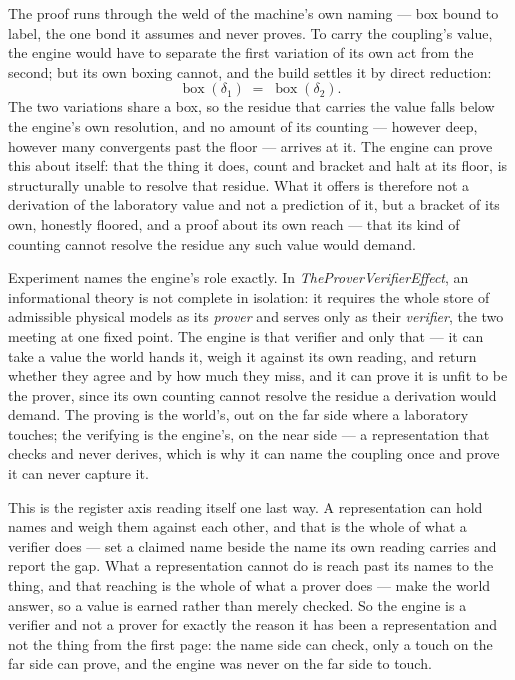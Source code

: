 The proof runs through the weld of the machine's own naming --- box bound to label, the one bond it assumes and never proves.
To carry the coupling's value, the engine would have to separate the first variation of its own act from the second;
but its own boxing cannot, and the build settles it by direct reduction:
\[
  \operatorname{box}(\delta_1) \;=\; \operatorname{box}(\delta_2).
\]
The two variations share a box, so the residue that carries the value falls below the engine's own resolution, and no
amount of its counting --- however deep, however many convergents past the floor --- arrives at it.
The engine can prove this about itself: that the thing it does, count and bracket and halt at its floor, is
structurally unable to resolve that residue.
What it offers is therefore not a derivation of the laboratory value and not a prediction of it, but a bracket of its
own, honestly floored, and a proof about its own reach --- that its kind of counting cannot resolve the residue any such
value would demand.

Experiment names the engine's role exactly.
In \emph{TheProverVerifierEffect}, an informational theory is not complete in isolation: it requires the whole store of
admissible physical models as its \emph{prover} and serves only as their \emph{verifier}, the two meeting at one fixed
point.
The engine is that verifier and only that --- it can take a value the world hands it, weigh it against its own reading,
and return whether they agree and by how much they miss, and it can prove it is unfit to be the prover, since its own
counting cannot resolve the residue a derivation would demand.
The proving is the world's, out on the far side where a laboratory touches; the verifying is the engine's, on the near
side --- a representation that checks and never derives, which is why it can name the coupling once and prove it can never
capture it.

This is the register axis reading itself one last way.
A representation can hold names and weigh them against each other, and that is the whole of what a verifier does --- set a
claimed name beside the name its own reading carries and report the gap.
What a representation cannot do is reach past its names to the thing, and that reaching is the whole of what a prover
does --- make the world answer, so a value is earned rather than merely checked.
So the engine is a verifier and not a prover for exactly the reason it has been a representation and not the thing from
the first page: the name side can check, only a touch on the far side can prove, and the engine was never on the far side
to touch.

